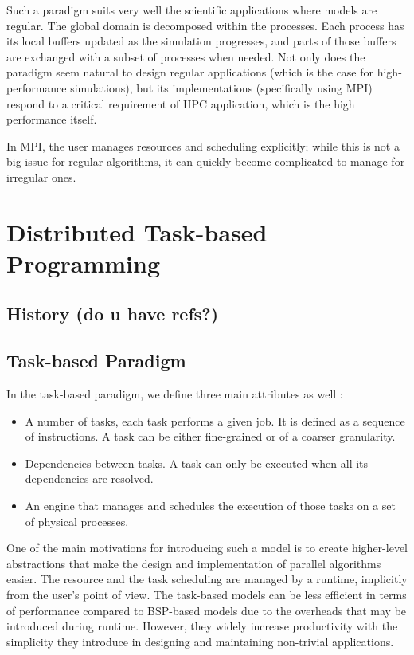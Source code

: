 Such a paradigm suits very well the scientific applications where models are regular. The global domain is decomposed within the processes. Each process has its local buffers updated as the simulation progresses, and parts of those buffers are exchanged with a subset of processes when needed. 
Not only does the paradigm seem natural to design regular applications (which is the case for high-performance simulations), but its implementations (specifically using MPI) respond to a critical requirement of HPC application, which is the high performance itself.

In MPI, the user manages resources and scheduling explicitly; while this is not a big issue for regular algorithms, it can quickly become complicated to manage for irregular ones.

\section{Distributed Task-based Programming}

\subsection{History (do u have refs?)}

\subsection{Task-based Paradigm} 

In the task-based paradigm, we define three main attributes as well :
\begin{itemize}
    \item A number of tasks, each task performs a given job. It is defined as a sequence of instructions. A task can be either fine-grained or of a coarser granularity. 
    \item Dependencies between tasks. A task can only be executed when all its dependencies are resolved.
    \item An engine that manages and schedules the execution of those tasks on a set of physical processes.
\end{itemize}

One of the main motivations for introducing such a model is to create higher-level abstractions that make the design and implementation of parallel algorithms easier. The resource and the task scheduling are managed by a runtime, implicitly from the user's point of view. The task-based models can be less efficient in terms of performance compared to BSP-based models due to the overheads that may be introduced during runtime. However, they widely increase productivity with the simplicity they introduce in designing and maintaining non-trivial applications.   


